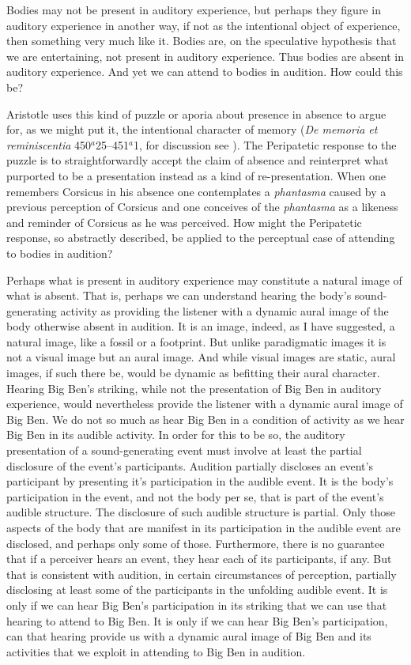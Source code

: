 \documentclass[12pt]{article}
\begin{document}
Bodies may not be present in auditory experience, but perhaps they figure in auditory experience in another way, if not as the intentional object of experience, then something very much like it. Bodies are, on the speculative hypothesis that we are entertaining, not present in auditory experience. Thus bodies are absent in auditory experience. And yet we can attend to bodies in audition. How could this be?

Aristotle uses this kind of puzzle or aporia about presence in absence to argue for, as we might put it, the intentional character of memory (\emph{De memoria et reminiscentia} 450\( ^{a} \)25--451\( ^{a} \)1, for discussion see \citealt{Sorabji:2004qa}). The Peripatetic response to the puzzle is to straightforwardly accept the claim of absence and reinterpret what purported to be a presentation instead as a kind of re-presentation. When one remembers Corsicus in his absence one contemplates a \emph{phantasma} caused by a previous perception of Corsicus and one conceives of the \emph{phantasma} as a likeness and reminder of Corsicus as he was perceived. How might the Peripatetic response, so abstractly described, be applied to the perceptual case of attending to bodies in audition?

Perhaps what is present in auditory experience may constitute a natural image of what is absent. That is, perhaps we can understand hearing the body’s sound-generating activity as providing the listener with a dynamic aural image of the body otherwise absent in audition. It is an image, indeed, as I have suggested, a natural image, like a fossil or a footprint. But unlike paradigmatic images it is not a visual image but an aural image. And while visual images are static, aural images, if such there be, would be dynamic as befitting their aural character. Hearing Big Ben’s striking, while not the presentation of Big Ben in auditory experience, would nevertheless provide the listener with a dynamic aural image of Big Ben. We do not so much as hear Big Ben in a condition of activity as we hear Big Ben in its audible activity. In order for this to be so, the auditory presentation of a sound-generating event must involve at least the partial disclosure of the event’s participants. Audition partially discloses an event’s participant by presenting it's participation in the audible event. It is the body’s participation in the event, and not the body per se, that is part of the event’s audible structure. The disclosure of such audible structure is partial. Only those aspects of the body that are manifest in its participation in the audible event are disclosed, and perhaps only some of those. Furthermore, there is no guarantee that if a perceiver hears an event, they hear each of its participants, if any. But that is consistent with audition, in certain circumstances of perception, partially disclosing at least some of the participants in the unfolding audible event. It is only if we can hear Big Ben’s participation in its striking that we can use that hearing to attend to Big Ben. It is only if we can hear Big Ben’s participation, can that hearing provide us with a dynamic aural image of Big Ben and its activities that we exploit in attending to Big Ben in audition.



\end{document}
